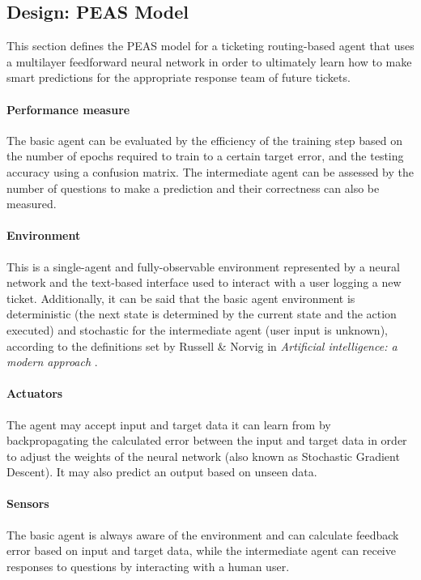 \documentclass[letterpaper,12pt]{article}
\begin{document}
\subsection{Design: PEAS Model}

This section defines the PEAS model for a ticketing routing-based agent that uses a multilayer feedforward neural network in order to ultimately learn how to make smart predictions for the appropriate response team of future tickets.

\paragraph{Performance measure}\label{sec:performance-measures} The basic agent can be evaluated by the efficiency of the training step based on the number of epochs required to train to a certain target error, and the testing accuracy using a confusion matrix. The intermediate agent can be assessed by the number of questions to make a prediction and their correctness can also be measured.

\paragraph{Environment} This is a single-agent and fully-observable environment represented by a neural network and the text-based interface used to interact with a user logging a new ticket. Additionally, it can be said that the basic agent environment is deterministic (the next state is determined by the current state and the action executed) and stochastic for the intermediate agent (user input is unknown), according to the definitions set by Russell \& Norvig in \textit{Artificial intelligence: a modern approach} \cite{russell2016artificial}.

\paragraph{Actuators} The agent may accept input and target data it can learn from by backpropagating the calculated error between the input and target data in order to adjust the weights of the neural network (also known as Stochastic Gradient Descent). It may also predict an output based on unseen data.

\paragraph{Sensors} The basic agent is always aware of the environment and can calculate feedback error based on input and target data, while the intermediate agent can receive responses to questions by interacting with a human user.
\end{document}
